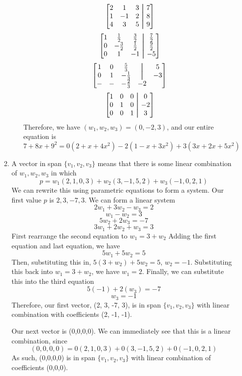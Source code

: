\documentclass[11pt, letterpaper, twoside]{article}
\newcommand\aug{\fboxsep=-\fboxrule\!\!\!\fbox{\strut}\!\!\!} %
\begin{document}
\begin{enumerate}
\begin{enumerate}[label=\alph*)]
\begin{enumerate}[label=\roman*)]
\[\begin{bmatrix}
    2&1&3&\aug&7\\
    1&-1&2&\aug&8\\
    4&3&5&\aug&9
\end{bmatrix}\]
\[\begin{bmatrix}
1&\frac{1}{2}&\frac{3}{2}&\aug&\frac{7}{2}\\
0&-\frac{3}{2}&\frac{1}{2}&\aug&\frac{9}{2}\\
0&1&-1&\aug&-5\\
\end{bmatrix}\]
\[\begin{bmatrix}
1&0&\frac{5}{3}&\aug&5\\
0&1&-\frac{1}{3}&\aug&-3\\
-&-&-\frac{2}{3}&-2\\
\end{bmatrix}\]
\[\begin{bmatrix}
1&0&0&\aug&0\\
0&1&0&\aug&-2\\
0&0&1&\aug&3
\end{bmatrix}\]
Therefore, we have \((w_1, w_2, w_3)=(0, -2, 3)\), and our entire equation is
\[7+8x+9^2=0(2+x+4x^2)-2(1-x+3x^2)+3(3x+2x+5x^2)\]
\end{enumerate}
\item A vector in span \(\{v_1, v_2, v_3\}\) means that there is some linear combination of \(w_1, w_2, w_3\) in which 
\[p=w_1(2,1,0,3)+w_2(3,-1,5,2)+w_3(-1,0,2,1)\]
We can rewrite this using parametric equations to form a system.
Our first value \(p\) is \(2, 3, -7, 3\).
We can form a linear system
\[2w_1+3w_2-w_3=2\]
\[w_1-w_2=3\]
\[5w_2+2w_3=-7\]
\[3w_1+2w_2+w_3=3\]
First rearrange the second equation to \(w_1=3+w_2\)
Adding the first equation and last equation, we have 
\[5w_1+5w_2=5\]
Then, substituting this in, \(5(3+w_2)+5w_2=5\), \(w_2=-1\). 
Substituting this back into \(w_1=3+w_2\), we have \(w_1=2\).
Finally, we can substitute this into the third equation 
\[5(-1)+2(w_3)=-7\]
\[w_3=-1\]
Therefore, our first vector, (2, 3, -7, 3), is in span \(\{v_1, v_2, v_3\}\) with linear combination with coefficients (2, -1, -1).

\vspace{1cm}
Our next vector is (0,0,0,0).
We can immediately see that this is a linear combination, since 
\[(0,0,0,0)=0(2,1,0,3)+0(3,-1,5,2)+0(-1,0,2,1)\]
As such, (0,0,0,0) is in span \(\{v_1, v_2, v_3\}\) with linear combination of coefficients (0,0,0).


\end{enumerate}
\end{enumerate}
\end{document}
